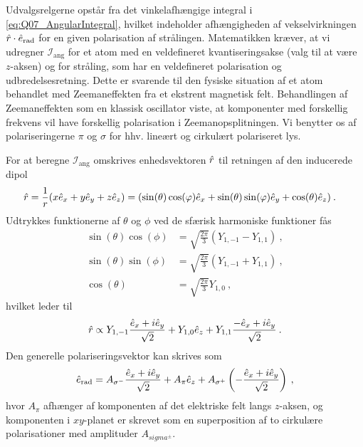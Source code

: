 Udvalgsrelgerne opstår fra det vinkelafhængige integral i \cref{eq:Q07_AngularIntegral}, hvilket indeholder afhængigheden af vekselvirkningen $\Hat{r}\cdot\Hat{e}_\text{rad}$ for en given polarisation af strålingen. Matematikken kræver, at vi udregner $\mathcal{I}_\text{ang}$ for et atom med en veldefineret kvantiseringsakse (valg til at være $z$-aksen) og for stråling, som har en veldefineret polarisation og udbredelsesretning. Dette er svarende til den fysiske situation af et atom behandlet med Zeemaneffekten fra et ekstrent magnetisk felt. Behandlingen af Zeemaneffekten som en klassisk oscillator viste, at komponenter med forskellig frekvens vil have forskellig polarisation i Zeemanopsplitningen. Vi benytter os af polariseringerne $\pi$ og $\sigma$ for hhv. lineært og cirkulært polariseret lys.

For at beregne $\mathcal{I}_\text{ang}$ omskrives enhedsvektoren $\Hat{r}$ til retningen af den inducerede dipol
\begin{align}
    \Hat{r} &= \frac{1}{r}(x\Hat{e}_x + y\Hat{e}_y + z\Hat{e}_z) = (\sin(\theta)\cos(\phi)\Hat{e}_x + \sin(\theta)\sin(\phi)\Hat{e}_y + \cos(\theta)\Hat{e}_z) \: .
\end{align}
Udtrykkes funktionerne af $\theta$ og $\phi$ ved de sfærisk harmoniske funktioner fås
\begin{align} \label{eq:Q07_SpericalHarmonicsAsCosAndSine}
    \sin(\theta)\cos(\phi) &= \sqrt{\frac{2\pi}{3}}(Y_{1,-1} - Y_{1,1}) \: , \nonumber\\
    \sin(\theta)\sin(\phi) &= \sqrt{\frac{2\pi}{3}}(Y_{1,-1} + Y_{1,1}) \: , \\
    \cos(\theta) &= \sqrt{\frac{2\pi}{3}}Y_{1,0} \: ,
\end{align}
hvilket leder til
\begin{align} \label{eq:Q07_rAsY}
    \Hat{r} \propto Y_{1,-1} \frac{\Hat{e}_x + i\Hat{e}_y}{\sqrt{2}} + Y_{1,0} \Hat{e}_z + Y_{1,1} \frac{-\Hat{e}_x + i\Hat{e}_y}{\sqrt{2}} \: .
\end{align}
Den generelle polariseringsvektor kan skrives som
\begin{align}
    \Hat{e}_\text{rad} = A_{\sigma^-} \frac{\Hat{e}_x + i\Hat{e}_y}{\sqrt{2}} + A_\pi \Hat{e}_z + A_{\sigma^+} \left(-\frac{\Hat{e}_x + i\Hat{e}_y}{\sqrt{2}}\right) \: ,
\end{align}
hvor $A_\pi$ afhænger af komponenten af det elektriske felt langs $z$-aksen, og komponenten i $xy$-planet er skrevet som en superposition af to cirkulære polarisationer med amplituder $A_{sigma^\pm}$.

